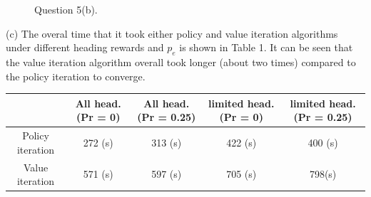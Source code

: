 \documentclass{article}
\begin{document}
\begin{figure}[h!]
\begin{minipage}{0.4\textwidth}
	\end{minipage}
	
	\caption{Question 5(b).}
	\label{fig:globfig}
\end{figure}	
	
	\newpage
	(c) 	The overal time that it took either policy and value iteration algorithms under different heading rewards and $p_{e}$ is shown in Table 1. It can be seen that the value iteration algorithm overall took longer (about two times) compared to the policy iteration to converge.
	\begin{center}
		\begin{tabular}{ |c|c|c|c|c| } 
			\hline
			& All head. (Pr = 0) & All head. (Pr = 0.25) & limited head. (Pr = 0) & limited head. (Pr = 0.25) \\ \hline
			Policy iteration & 272 (s) & 313 (s) & 422 (s) & 400 (s) \\ \hline
			Value iteration & 571 (s) & 597 (s) & 705 (s) & 798(s) \\ \hline
			\hline
		\end{tabular}
	\end{center}
	
\end{document}
